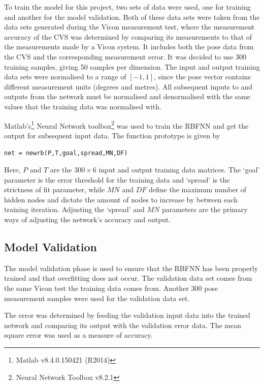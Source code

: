 To train the model for this project, two sets of data were used, one for training and another for the model validation. Both of these data sets were taken from the data sets generated during the Vicon measurement test, where the measurement accuracy of the CVS was determined by comparing its measurements to that of the measurements made by a Vicon system. It includes both the pose data from the CVS and the corresponding measurement error. It was decided to use 300 training samples, giving 50 samples per dimension. The input and output training data sets were normalised to a range of $[-1, 1]$, since the pose vector contains different measurement units (degrees and metres). All subsequent inputs to and outputs from the network must be normalised and denormalised with the same values that the training data was normalised with.  

Matlab's\footnote{Matlab v8.4.0.150421 (R2014)} Neural Network toolbox\footnote{Neural Network Toolbox v8.2.1} was used to train the RBFNN and get the output for subsequent input data. The function prototype is given by 

\begin{center}
  \verb|net = newrb(P,T,goal,spread,MN,DF)|
\end{center}

Here, $P$ and $T$ are the $300\times6$ input and output training data matrices. The `goal' parameter is the error threshold for the training data and `spread' is the strictness of fit parameter, while $MN$ and $DF$ define the maximum number of hidden nodes and dictate the amount of nodes to increase by between each training iteration. Adjusting the `spread' and $MN$ parameters are the primary ways of adjusting the network's accuracy and output. 

\subsection{Model Validation}

The model validation phase is used to ensure that the RBFNN has been properly trained and that overfitting does not occur. The validation data set comes from the same Vicon test the training data comes from. Another 300 pose measurement samples were used for the validation data set. 

The error was determined by feeding the validation input data into the trained network and comparing its output with the validation error data. The mean square error was used as a measure of accuracy. 

